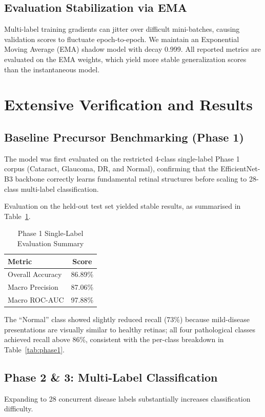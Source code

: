 \documentclass[conference]{IEEEtran}
\begin{document}
\subsection{Evaluation Stabilization via EMA}
Multi-label training gradients can jitter over difficult mini-batches, causing validation scores to fluctuate epoch-to-epoch. We maintain an Exponential Moving Average (EMA) shadow model with decay 0.999. All reported metrics are evaluated on the EMA weights, which yield more stable generalization scores than the instantaneous model.


\section{Extensive Verification and Results}

\subsection{Baseline Precursor Benchmarking (Phase 1)}
The model was first evaluated on the restricted 4-class single-label Phase 1 corpus (Cataract, Glaucoma, DR, and Normal), confirming that the EfficientNet-B3 backbone correctly learns fundamental retinal structures before scaling to 28-class multi-label classification.

Evaluation on the held-out test set yielded stable results, as summarised in Table~\ref{tab:phase1_summary}.

\begin{table}[ht]
\centering
\caption{Phase 1 Single-Label Evaluation Summary}
\label{tab:phase1_summary}
\begin{tabular}{lc}
\toprule
\textbf{Metric} & \textbf{Score} \\
\midrule
Overall Accuracy       & 86.89\% \\
Macro Precision        & 87.06\% \\
Macro ROC-AUC          & 97.88\% \\
\bottomrule
\end{tabular}
\end{table}

The ``Normal'' class showed slightly reduced recall (73\%) because mild-disease presentations are visually similar to healthy retinas; all four pathological classes achieved recall above 86\%, consistent with the per-class breakdown in Table~\ref{tab:phase1}.

\subsection{Phase 2 \& 3: Multi-Label Classification}
Expanding to 28 concurrent disease labels substantially increases classification difficulty.
\end{document}
